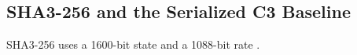\subsection{SHA3-256 and the Serialized C3 Baseline}
SHA3-256 uses a 1600-bit state and a 1088-bit rate \cite{fips202}.

